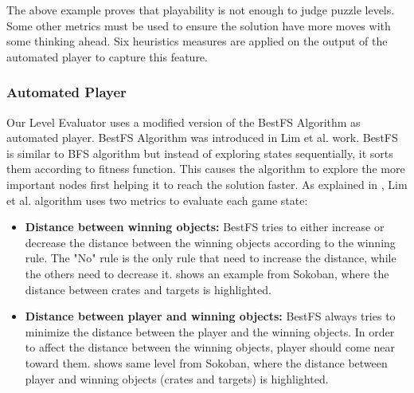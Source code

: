 
The above example proves that playability is not enough to judge puzzle levels. Some other metrics must be used to ensure the solution have more moves with some thinking ahead. Six heuristics measures are applied on the output of the automated player to capture this feature.

\subsubsection{Automated Player}
Our Level Evaluator uses a modified version of the BestFS Algorithm as automated player. BestFS Algorithm was introduced in Lim et al.\cite{puzzleScriptGeneration} work. BestFS is similar to BFS algorithm but instead of exploring states sequentially, it sorts them according to fitness function. This causes the algorithm to explore the more important nodes first helping it to reach the solution faster. As explained in , Lim et al. algorithm uses two metrics to evaluate each game state:
\begin{itemize} \itemsep0pt \parskip0pt 
	\item \textbf{Distance between winning objects:} BestFS tries to either increase or decrease the distance between the winning objects according to the winning rule. The "No" rule is the only rule that need to increase the distance, while the others need to decrease it.  shows an example from Sokoban, where the distance between crates and targets is highlighted.
	\item \textbf{Distance between player and winning objects:} BestFS always tries to minimize the distance between the player and the winning objects. In order to affect the distance between the winning objects, player should come near toward them.  shows same level from Sokoban, where the distance between player and winning objects (crates and targets) is highlighted.
\end{itemize}

